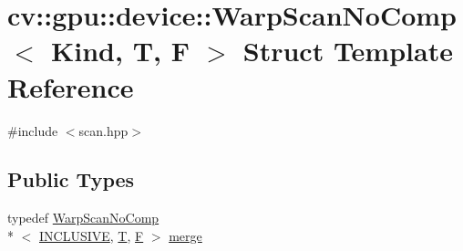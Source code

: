 \hypertarget{structcv_1_1gpu_1_1device_1_1WarpScanNoComp}{\section{cv\-:\-:gpu\-:\-:device\-:\-:Warp\-Scan\-No\-Comp$<$ Kind, T, F $>$ Struct Template Reference}
\label{structcv_1_1gpu_1_1device_1_1WarpScanNoComp}
}


{\ttfamily \#include $<$scan.\-hpp$>$}

\subsection*{Public Types}
\begin{DoxyCompactItemize}
\item 
typedef \hyperlink{structcv_1_1gpu_1_1device_1_1WarpScanNoComp}{Warp\-Scan\-No\-Comp}\\*
$<$ \hyperlink{namespacecv_1_1gpu_1_1device_a28816cb295b05f754b37820576d20aefa2c3c91d1e8338cd34af5d45feb97bdf7}{I\-N\-C\-L\-U\-S\-I\-V\-E}, \hyperlink{calib3d_8hpp_a3efb9551a871ddd0463079a808916717}{T}, \hyperlink{calib3d_8hpp_acc93c21c0e709826b318c946961af8fc}{F} $>$ \hyperlink{structcv_1_1gpu_1_1device_1_1WarpScanNoComp_acf9dd68d2e827324390f85adf5847ae3}{merge}
\end{DoxyCompactItemize}
